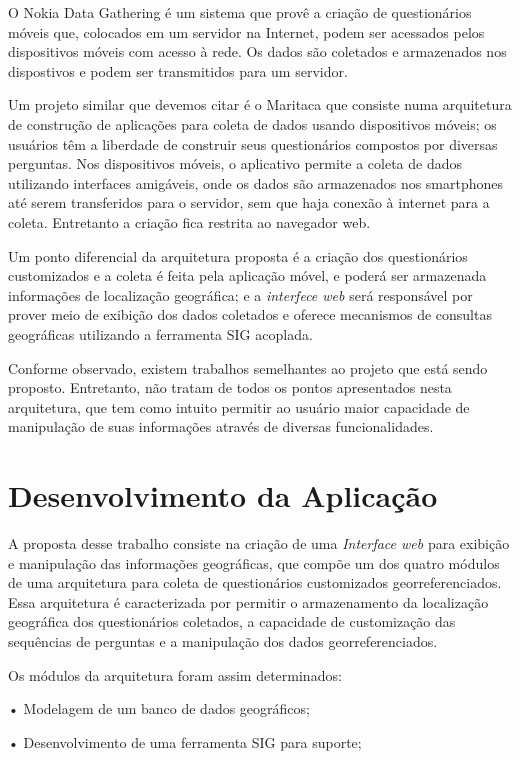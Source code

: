 \documentclass[
	12pt,				%
    oneside,			%
	a4paper,			%
	english,			%
	french,				%
	spanish,			%
	brazil,				%
	]{abntex2}
\begin{document}
O Nokia Data Gathering é um sistema que provê a criação de questionários móveis que, colocados em um servidor na Internet, podem ser acessados pelos dispositivos móveis com acesso à rede. Os dados são coletados e armazenados nos dispostivos e podem ser transmitidos para um servidor. 

Um projeto similar que devemos citar é o Maritaca que consiste numa arquitetura de construção de aplicações para coleta de dados usando dispositivos móveis; os usuários têm a liberdade de construir seus questionários compostos por diversas perguntas. Nos dispositivos móveis, o aplicativo permite a coleta de dados utilizando interfaces amigáveis, onde os dados são armazenados nos smartphones até serem transferidos para o servidor, sem que haja conexão à internet para a coleta. Entretanto a criação fica restrita ao navegador web.

Um ponto diferencial da arquitetura proposta é a criação dos questionários customizados e a coleta é feita pela aplicação móvel, e poderá ser armazenada informações de localização geográfica; e a \textit{interfece web} será responsável por prover meio de exibição dos dados coletados e oferece mecanismos de consultas geográficas utilizando a ferramenta SIG acoplada.

Conforme observado, existem trabalhos semelhantes ao projeto que está sendo proposto. Entretanto, não tratam de todos os pontos apresentados nesta arquitetura, que tem como intuito permitir ao usuário maior capacidade de manipulação de suas informações através de diversas funcionalidades.



\chapter{Desenvolvimento da Aplicação}
A proposta desse trabalho consiste na criação de uma \textit{Interface web} para exibição e manipulação das informações geográficas, que compõe um dos quatro módulos de uma arquitetura para coleta de questionários customizados georreferenciados. Essa arquitetura é caracterizada por permitir o armazenamento da localização geográfica dos questionários coletados, a capacidade de customização das sequências de perguntas e a manipulação dos dados georreferenciados.

Os módulos da arquitetura foram assim determinados: 

•	Modelagem de um banco de dados geográficos; 

•	Desenvolvimento de uma ferramenta SIG para suporte;
\end{document}
